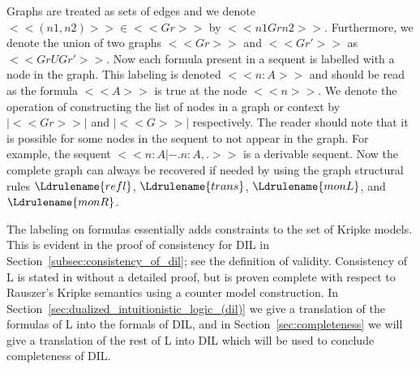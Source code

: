 Graphs are treated as sets of edges and we denote $<<(n1,n2)>> \in
<<Gr>>$ by $<<n1 Gr n2>>$.  Furthermore, we denote the union of two
graphs $<<Gr>>$ and $<<Gr'>>$ as $<<Gr U Gr'>>$. Now each formula
present in a sequent is labelled with a node in the graph.  This
labeling is denoted $<<n : A>>$ and should be read as the formula
$<<A>>$ is true at the node $<<n>>$.  We denote the operation of
constructing the list of nodes in a graph or context by $|<<Gr>>|$
and $|<<G>>|$ respectively. The reader should note that it is possible
for some nodes in the sequent to not appear in the graph.  For
example, the sequent $<<n : A |- . n : A,.>>$ is a derivable sequent.
Now the complete graph can always be recovered if needed by using the
graph structural rules $\Ldrulename{refl}$, $\Ldrulename{trans}$,
$\Ldrulename{monL}$, and $\Ldrulename{monR}$.

The labeling on formulas essentially adds constraints to the set of
Kripke models.  This is evident in the proof of consistency for DIL in
Section~\ref{subsec:consistency_of_dil}; see the definition of
validity. Consistency of L is stated in \cite{Pinto:2009} without a
detailed proof, but is proven complete with respect to Rauszer's
Kripke semantics using a counter model construction.  In
Section~\ref{sec:dualized_intuitionistic_logic_(dil)} we give a
translation of the formulas of L into the formals of DIL, and in
Section~\ref{sec:completeness} we will give a translation of the rest
of L into DIL which will be used to conclude completeness of DIL.

